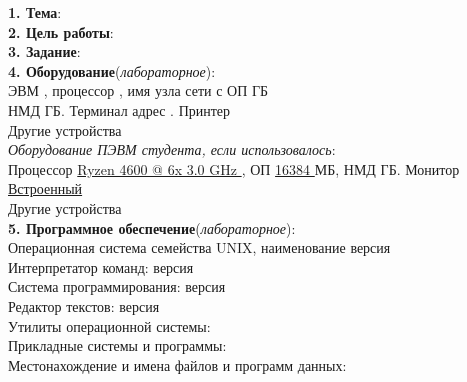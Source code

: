 \documentclass[10pt]{report}
\begin{document}
    \begin{spacing}{1}
        \indent \textbf{1. Тема}: \\               %
        \indent \textbf{2. Цель работы}: \underline{}  \\       %
        \indent \textbf{3. Задание}: \underline{}  \\           %
        \indent \textbf{4. Оборудование}(\textit{лабораторное}):  \\ 
        \indent ЭВМ \tlinee{0.5in}, процессор \tlinee{0.7in}, имя узла сети \tlinee{0.3in} с ОП \tlinee{0.2in} ГБ\\
        \indent НМД \tlinee{0.5in} ГБ. Терминал \tlinee{0.7in} адрес \tlinee{0.7in}. Принтер \tlinee{0.7in}\\
        \indent Другие устройства \tlinee{2.5in} \\
        \indent \textit{Оборудование ПЭВМ студента, если использовалось}:  \\ 
        \indent Процессор \underline{ Ryzen 4600 @ 6x 3.0 GHz }, ОП \underline{ 16384 } МБ, НМД \tlinee{0.5in}ГБ. Монитор \underline{ Встроенный }\\
        \indent Другие устройства \tlinee{2.5in} \\

        \indent \textbf{5. Программное обеспечение}(\textit{лабораторное}):  \\ 
        \indent Операционная система семейства UNIX, наименование \underline{\hspace{0.5in}} версия \underline{\hspace{0.5in}}\\
        \indent Интерпретатор  команд: \underline{\hspace{2in}} версия \tlinee{0.5in}\\
        \indent Система программирования: \tlinee{2in} версия \tlinee{0.5in}\\
        \indent Редактор текстов: \tlinee{2in} версия \tlinee{0.5in}\\
        \indent Утилиты операционной системы: \tlinee{4in}\\
        \indent Прикладные системы и программы: \tlinee{3.7in}\\
        \indent Местонахождение и имена файлов и программ данных: \tlinee{2.2in}\\


\end{spacing}
\end{document}
